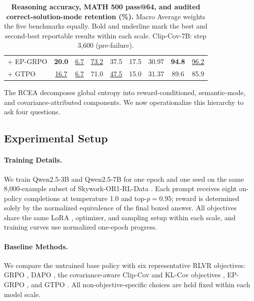 \documentclass[letterpaper]{article} %
\begin{document}
\begin{table}[t]
\begin{tabular}{lcccccccc}
		\quad + EP-GRPO \citep{yu2026epgrpo}
		& \textbf{20.0} & \underline{6.7} & \underline{73.2} & 37.5 & 17.5 & 30.97 & \textbf{94.8} & \underline{96.2} \\
		\quad + GTPO \citep{simoni2025gtpo}
		& \underline{16.7} & \underline{6.7} & 71.0 & \underline{47.5} & 15.0 & 31.37 & 89.6 & 85.9 \\
		\bottomrule
	\end{tabular}
	\caption{\textbf{Reasoning accuracy, MATH 500 pass@64, and audited correct-solution-mode retention (\%).} Macro Average weights the five benchmarks equally. Bold and underline mark the best and second-best reportable results within each scale. Clip-Cov-7B: step 3,600 (pre-failure).}
	\label{tab:main-results}
\end{table}
The RCEA decomposes global entropy into reward-conditioned, semantic-mode, and covariance-attributed components. We now operationalize this hierarchy to ask four questions. 

\subsection{Experimental Setup}
\paragraph{Training Details.}
We train Qwen2.5-3B and Qwen2.5-7B \citep{qwen2024qwen25} for one epoch and one seed on the same 8,000-example subset of Skywork-OR1-RL-Data \citep{skywork2025or1data}. Each prompt receives eight on-policy completions at temperature 1.0 and top-\(p=0.95\); reward is determined solely by the normalized equivalence of the final boxed answer. All objectives share the same LoRA \citep{hu2022lora}, optimizer, and sampling setup within each scale, and training curves use normalized one-epoch progress.

\paragraph{Baseline Methods.}
We compare the untrained base policy with six representative RLVR objectives: GRPO \citep{shao2024deepseekmath}, DAPO \citep{yu2025dapo}, the covariance-aware Clip-Cov and KL-Cov objectives \citep{cui2025entropy}, EP-GRPO \citep{yu2026epgrpo}, and GTPO \citep{simoni2025gtpo}. All non-objective-specific choices are held fixed within each model scale.
\end{document}
